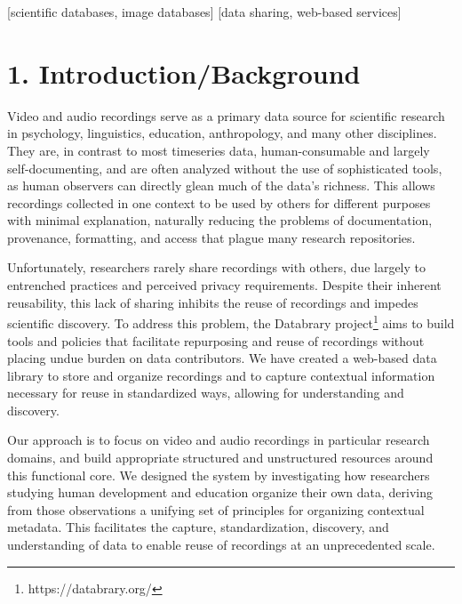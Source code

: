 \documentclass{sig-alternate}
\begin{document}
[scientific databases, image databases]
[data sharing, web-based services]



\section{1. Introduction/Background}

Video and audio recordings serve as a primary data source for scientific research in psychology, linguistics, education, anthropology, and many other disciplines.
They are, in contrast to most timeseries data, human-consumable and largely self-documenting, and are often analyzed without the use of sophisticated tools, as human observers can directly glean much of the data's richness.
This allows recordings collected in one context to be used by others for different purposes with minimal explanation, naturally reducing the problems of documentation, provenance, formatting, and access that plague many research repositories.

Unfortunately, researchers rarely share recordings with others, due largely to entrenched practices and perceived privacy requirements.
Despite their inherent reusability, this lack of sharing inhibits the reuse of recordings and impedes scientific discovery.
To address this problem, the Databrary project\footnote{https://databrary.org/} aims to build tools and policies that facilitate repurposing and reuse of recordings without placing undue burden on data contributors.
We have created a web-based data library to store and organize recordings and to capture contextual information necessary for reuse in standardized ways, allowing for understanding and discovery.

Our approach is to focus on video and audio recordings in particular research domains, and build appropriate structured and unstructured resources around this functional core.
We designed the system by investigating how researchers studying human development and education organize their own data, deriving from those observations a unifying set of principles for organizing contextual metadata.
This facilitates the capture, standardization, discovery, and understanding of data to enable reuse of recordings at an unprecedented scale.
\end{document}
